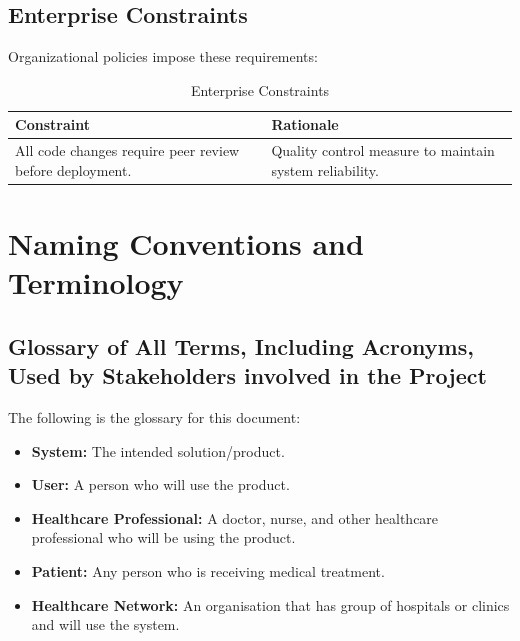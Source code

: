\documentclass[12pt]{article}
\begin{document}
\subsection{Enterprise Constraints}
Organizational policies impose these requirements:

\begin{table}[H]
\centering
\begin{tabular}{|p{6cm}|p{6cm}|}
\hline
\textbf{Constraint} & \textbf{Rationale} \\
\hline
All code changes require peer review before deployment. & Quality control measure to maintain system reliability. \\
\hline
\end{tabular}
\caption{Enterprise Constraints}
\label{tab:enterprise_constraints}
\end{table}

\section{Naming Conventions and Terminology}

\subsection{Glossary of All Terms, Including Acronyms, Used by Stakeholders
involved in the Project}
The following is the glossary for this document:
\begin{itemize}
  \item \textbf{System:} The intended solution/product.
  \item \textbf{User:} A person who will use the product.
  \item \textbf{Healthcare Professional:} A doctor, nurse, and other healthcare professional who will be using the product.
  \item \textbf{Patient:} Any person who is receiving medical treatment.
  \item \textbf{Healthcare Network:} An organisation that has group of hospitals or clinics and will use the system.
\end{itemize}
\end{document}

